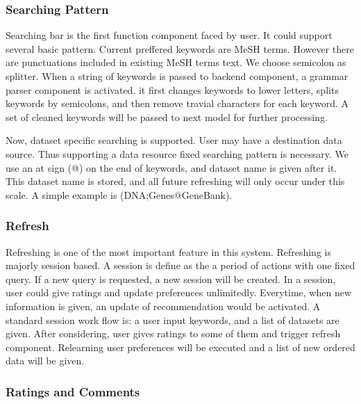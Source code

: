 \documentclass[twoside,11pt]{article}
\begin{document}

    \subsubsection{Searching Pattern} %
    \label{ssub:searching_pattern}

        Searching bar is the first function component faced by user. It could support several basic pattern. Current preffered keywords are MeSH terms. However there are punctuations included in existing MeSH terms text. We choose semicolon as splitter. When a string of keywords is passed to backend component, a grammar parser component is activated. it first changes keywords to lower letters, splits keywords by semicolons, and then remove travial characters for each keyword. A set of cleaned keywords will be passed to next model for further processing.

        Now, dataset specific searching is supported. User may have a destination data source. Thus supporting a data resource fixed searching pattern is necessary. We use an at sign (@) on the end of keywords, and dataset name is given after it. This dataset name is stored, and all future refreshing will only occur under this scale. A simple example is (DNA;Genes@GeneBank).


    \subsubsection{Refresh} %
    \label{ssub:efresh}

        Refreshing is one of the most important feature in this system. Refreshing is majorly session based. A session is define as the a period of actions with one fixed query. If a new query is requested, a new session will be created. In a session, user could give ratings and update preferences unlimitedly. Everytime, when new information is given, an update of recommendation would be activated. A standard session work flow is: a user input keywords, and a list of datasets are given. After considering, user gives ratings to some of them and trigger refresh component. Relearning user preferences will be executed and a list of new ordered data will be given.
    

    \subsubsection{Ratings and Comments} %
    \label{ssub:ratings_and_comments}
        
\end{document}
